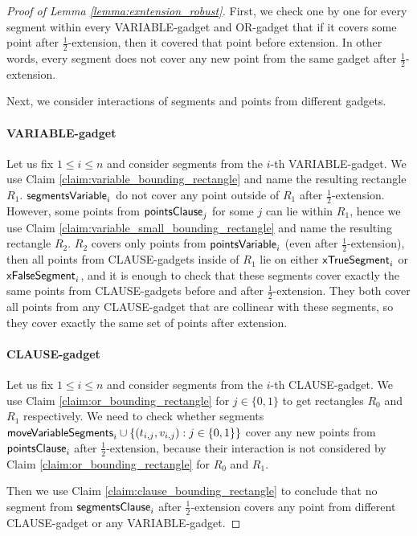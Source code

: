 \begin{proof}[Proof of Lemma \ref{lemma:exntension_robust}]
First, we check one by one for every segment within every
VARIABLE-gadget and OR-gadget
that if it covers some point after $\frac{1}{2}$-extension,
then it covered that point before extension. In other words,
every segment does not cover any new point from
the same gadget after $\frac{1}{2}$-extension.

Next, we consider interactions of segments and points
from different gadgets.

\paragraph{VARIABLE-gadget}
Let us fix $1 \le i \le n$
and consider segments from the $i$-th VARIABLE-gadget.
We use Claim \ref{claim:variable_bounding_rectangle}
and name the resulting rectangle $R_1$. $\mathsf{segmentsVariable}_{i}$
do not cover any point outside of $R_1$
after $\frac{1}{2}$-extension.
However, some points from $\mathsf{pointsClause}_{j}$
for some $j$ can lie within $R_1$,
hence we use Claim \ref{claim:variable_small_bounding_rectangle}
and name the resulting rectangle $R_2$.
$R_2$ covers only points from $\mathsf{pointsVariable}_{i}$
(even after $\frac{1}{2}$-extension),
then all points from CLAUSE-gadgets inside of $R_1$
lie on either $\mathsf{xTrueSegment}_{i}$ or $\mathsf{xFalseSegment}_{i}$,
and it is enough to check that these segments cover exactly the same
points from CLAUSE-gadgets before and after $\frac{1}{2}$-extension.
They both cover all points from any CLAUSE-gadget that are collinear
with these segments, so they cover exactly the same set of points
after extension.

\paragraph{CLAUSE-gadget}
Let us fix $1 \le i \le n$ and consider
segments from the $i$-th CLAUSE-gadget.
We use Claim \ref{claim:or_bounding_rectangle}
for $j \in \{0, 1\}$ to get rectangles $R_0$ and $R_1$ respectively.
We need to check whether segments
$\mathsf{moveVariableSegments}_{i} \cup \{(t_{i, j}, v_{i, j}) : j \in \{0, 1\}\}$
cover any new points from $\mathsf{pointsClause}_{i}$
after $\frac{1}{2}$-extension, because their interaction
is not considered by Claim \ref{claim:or_bounding_rectangle} for $R_0$ and $R_1$.

Then we use Claim \ref{claim:clause_bounding_rectangle}
to conclude that no segment from $\mathsf{segmentsClause}_i$
after $\frac{1}{2}$-extension covers
any point from different CLAUSE-gadget or any VARIABLE-gadget.
\end{proof}

